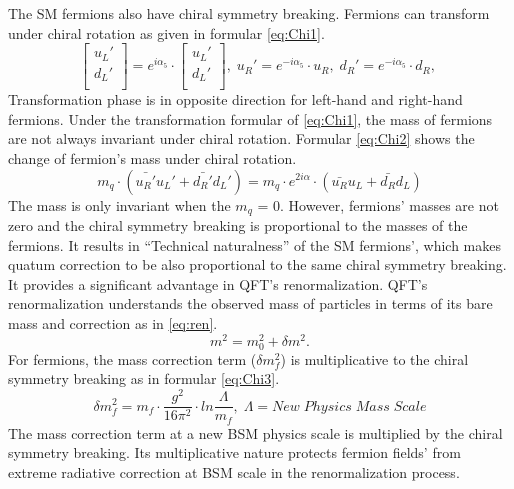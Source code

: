 The SM fermions also have chiral symmetry breaking.
Fermions can transform under chiral rotation as given in formular \ref{eq:Chi1}. 
\begin{equation}
\label{eq:Chi1}
\begin{bmatrix}	u_L' \\	d_L' \\\end{bmatrix}
	=e^{i\alpha_5}\cdot 
\begin{bmatrix} u_L' \\ d_L' \\\end{bmatrix}, \;
u_R' = e^{-i\alpha_5}\cdot u_R, \; 
d_R' = e^{-i\alpha_5}\cdot d_R, \; 
\end{equation}
Transformation phase is in opposite direction for left-hand and right-hand fermions.
Under the transformation formular of \ref{eq:Chi1}, the mass of fermions are not always invariant under chiral rotation.
Formular \ref{eq:Chi2} shows the change of fermion's mass under chiral rotation.
\begin{equation}
\label{eq:Chi2}
	m_q\cdot(\bar{u_R'}u_L'+\bar{d_R'}d_L') = m_q\cdot e^{2i\alpha}\cdot (\bar{u_R}u_L+\bar{d_R}d_L)
\end{equation}
The mass is only invariant when the $m_{q}$ = 0.
However, fermions' masses are not zero and the chiral symmetry breaking is proportional to the masses of the fermions.
It results in ``Technical naturalness'' of the SM fermions', which makes quatum correction to be also proportional to the same chiral symmetry breaking.
It provides a significant advantage in QFT's renormalization.
QFT's renormalization understands the observed mass of particles in terms of its bare mass and correction as in \ref{eq:ren}.
\begin{equation}
\label{eq:ren}
	m^{2}=m_{0}^{2}+\delta m^2.
\end{equation}
For fermions, the mass correction term ($\delta m_{f}^2$) is multiplicative to the chiral symmetry breaking as in formular \ref{eq:Chi3}.
\begin{equation}
\label{eq:Chi3}
	\delta m_{f}^2=m_{f}\cdot \frac{g^2}{16\pi^2}\cdot ln\frac{\Lambda}{m_{f}},\;\Lambda = New\;Physics\;Mass\;Scale
\end{equation}
The mass correction term at a new BSM physics scale is multiplied by the chiral symmetry breaking.
Its multiplicative nature protects fermion fields' from extreme radiative correction at BSM scale in the renormalization process.

